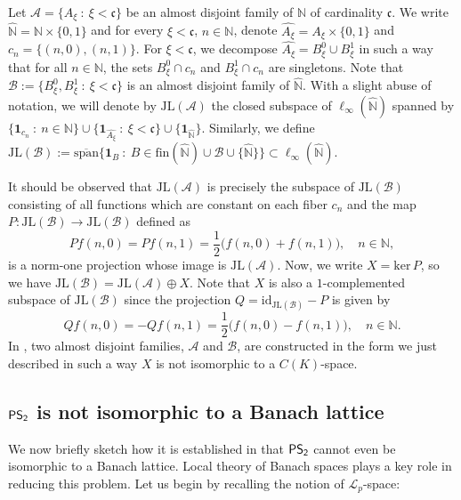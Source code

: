 \documentclass[11pt]{amsart}
\theoremstyle{definition}
\numberwithin{equation}{section}
\newcommand\PS{{\normalfont\textsf{PS}}_\textsf{2}}
\begin{document}
Let $\mathcal{A}=\{A_\xi\::\:\xi<\mathfrak{c}\}$ be an almost disjoint family of $\mathbb{N}$ of cardinality $\mathfrak{c}$. We write $\widehat{\mathbb{N}}=\mathbb{N}\times\{0,1\}$ and for every $\xi<\mathfrak{c}$, $n\in\mathbb{N}$, denote $\widehat{A_\xi}=A_\xi\times\{0,1\}$ and $c_n=\{(n,0),(n,1)\}$. For $\xi<\mathfrak{c}$, we decompose $\widehat{A_\xi}=B_\xi^0\cup B_\xi^1$ in such a way that for all $n\in\mathbb{N}$, the sets $B_\xi^0\cap c_n$ and $B_\xi^1\cap c_n$ are singletons. Note that $\mathcal{B}:=\{B_\xi^0,B_\xi^1\::\:\xi<\mathfrak{c}\}$ is an almost disjoint family of $\widehat{\mathbb{N}}$. With a slight abuse of notation, we will denote by $\text{JL}(\mathcal{A})$ the closed subspace of $\ell_\infty(\widehat{\mathbb{N}})$ spanned by $\{\mathbf{1}_{c_n}\::\:n\in\mathbb{N}\}\cup\bigl\{\mathbf{1}_{\widehat{A_\xi}}\::\:\xi<\mathfrak{c}\bigr\}\cup\bigl\{\mathbf{1}_{\widehat{\mathbb{N}}}\bigr\}$. Similarly, we define $\text{JL}(\mathcal{B}):=\overline{\text{span}}\bigl\{\mathbf{1}_B\::\:B\in \text{fin}(\widehat{\mathbb{N}})\cup\mathcal{B}\cup\{\widehat{\mathbb{N}}\}\bigr\}\subset \ell_\infty(\widehat{\mathbb{N}})$. 

It should be observed that $\text{JL}(\mathcal{A})$ is precisely the subspace of $\text{JL}(\mathcal{B})$ consisting of all functions which are constant on each fiber $c_n$ and the map 
$P: \text{JL}(\mathcal{B}) \to \text{JL}(\mathcal{B})$ defined as 
\[ Pf(n,0) = Pf(n,1) = \frac{1}{2}\big(f(n,0)+f(n,1)\big), \quad n\in\mathbb{N},\]
is a norm-one projection whose image is $\text{JL}(\mathcal{A})$. Now, we write $X=\text{ker}\,P$, so we have $\text{JL}(\mathcal{B})=\text{JL}(\mathcal{A})\oplus X$. Note that $X$ is also a $1$-complemented subspace of $\text{JL}(\mathcal{B})$ since the projection $Q=\text{id}_{\text{JL}(\mathcal{B})}-P$ is given by
$$
Qf(n,0) = - Qf(n,1) = \frac12\big(f(n,0) - f(n,1)\big),\quad n\in\mathbb{N}.
$$
In \cite{PS2}, two almost disjoint families, $\mathcal{A}$ and $\mathcal{B}$, are constructed in the form we just described in such a way $X$ is not isomorphic to a $C(K)$-space.


\subsection{$\PS$ is not isomorphic to a Banach lattice} We now briefly sketch how it is established in \cite{dHMST23} that $\PS$ cannot even be isomorphic to a Banach lattice. Local theory of Banach spaces plays a key role in reducing this problem. Let us begin by recalling the notion of $\mathcal{L}_p$-space:
\end{document}

